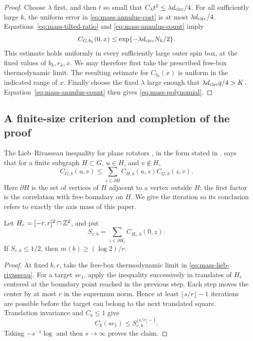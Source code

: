 \begin{proof}
Choose \(\lambda\) first, and then \(t\) so small that
\(C_\lambda t^2\le\lambda d_{\rm circ}/4\).  For all sufficiently large
\(k\), the uniform error in \eqref{eq:mass-annulus-cost} is at most
\(\lambda d_{\rm circ}/4\).  Equations~\eqref{eq:mass-tilted-ratio} and
\eqref{eq:mass-annulus-count} imply
\[
                    C_{G,b_k}(0,x)
                         \le\exp\{-\lambda d_{\rm circ}N_k/2\}.
\]
This estimate holds uniformly in every sufficiently large outer
spin box, at the fixed values of \(b_k,r_k,x\).  We may therefore
first take the prescribed free-box thermodynamic limit.  The
resulting estimate for \(C_{b_k}(x)\) is uniform in the indicated
range of \(x\).  Finally choose the fixed \(\lambda\) large enough
that \(\lambda d_{\rm circ}q/4>K\).  Equation~\eqref{eq:mass-annulus-count}
then gives \eqref{eq:mass-polynomial}.
\end{proof}

\subsection{A finite-size criterion and completion of the proof}

The Lieb--Rivasseau inequality for plane rotators
\cite{Lieb,Rivasseau}, in the form stated in
\cite[Lemma~17]{vEL}, says that for a finite subgraph \(H\subset G\),
\(u\in H\), and \(v\notin H\),
\begin{equation}\label{eq:mass-lieb-rivasseau}
 C_{G,b}(u,v)\le\sum_{z\in\partial H}
                       C_{H,b}(u,z)C_{G,b}(z,v).
\end{equation}
Here \(\partial H\) is the set of vertices of \(H\) adjacent to a
vertex outside \(H\); the first factor is the correlation with
free boundary on \(H\).  We give the iteration so its conclusion
refers to exactly the axis mass of this paper.

\begin{lemma}\label{lem:mass-finite-size}
Let \(H_r=[-r,r]^2\cap\mathbb Z^2\), and put
\[
                 S_{r,b}=\sum_{z\in\partial H_r}C_{H_r,b}(0,z).
\]
If \(S_{r,b}\le1/2\), then \(m(b)\ge(\log2)/r\).
\end{lemma}

\begin{proof}
At fixed \(b,r\), take the free-box thermodynamic limit in
\eqref{eq:mass-lieb-rivasseau}.  For a target \(se_1\), apply the
inequality successively in translates of \(H_r\) centered at the
boundary point reached in the previous step.  Each step moves the
center by at most \(r\) in the supremum norm.  Hence at least
\(\lfloor s/r\rfloor-1\) iterations are possible before the target
can belong to the next translated square.  Translation invariance
and \(C_b\le1\) give
\[
                   C_b(se_1)\le
                    S_{r,b}^{\lfloor s/r\rfloor-1}.
\]
Taking \(-s^{-1}\log\) and then \(s\to\infty\) proves the claim.
\end{proof}

